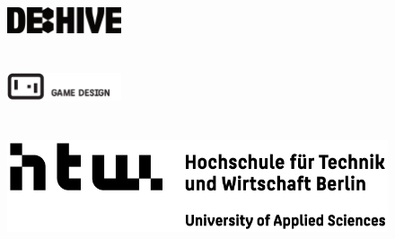 \thispagestyle{empty}

\begin{center}
    \begin{figure}[!b]
        \includegraphics[width=0.3\textwidth]{figures/HIVE_Logo} \\
        \\
        \\
        \includegraphics[width=0.3\textwidth]{figures/GD_Logo} \\
        \\
        \\
        \includegraphics{figures/HTW_Logo}
    \end{figure}
\end{center}